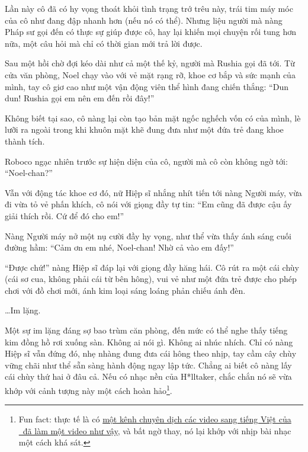 \documentclass[../main.tex]{subfiles}
\begin{document}
Lần này cô đã có hy vọng thoát khỏi tình trạng trớ trêu này, trái tim máy móc của cô như đang đập nhanh hơn (nếu nó có thể). Nhưng liệu người mà nàng Pháp sư gọi đến có thực sự giúp được cô, hay lại khiến mọi chuyện rối tung hơn nữa, một câu hỏi mà chỉ có thời gian mới trả lời được.

\ct

Sau một hồi chờ đợi kéo dài như cả một thế kỷ, người mà Rushia gọi đã tới. Từ cửa văn phòng, Noel chạy vào với vẻ mặt rạng rỡ, khoe cơ bắp và sức mạnh của mình, tay cô giơ cao như một vận động viên thể hình đang chiến thắng: ``Dun dun! Rushia gọi em nên em đến rồi đây!''

Không biết tại sao, cô nàng lại còn tạo bản mặt ngốc nghếch vốn có của mình, lè lưỡi ra ngoài trong khi khuôn mặt khẽ đung đưa như một đứa trẻ đang khoe thành tích.

Roboco ngạc nhiên trước sự hiện diện của cô, người mà cô còn không ngờ tới: ``Noel-chan?''

Vẫn với động tác khoe cơ đó, nữ Hiệp sĩ nhắng nhít tiến tới nàng Người máy, vừa đi vừa tỏ vẻ phấn khích, cô nói với giọng đầy tự tin: ``Em cũng đã được cậu ấy giải thích rồi. Cứ để đó cho em!''

\begin{figure}[H]
  \centering
  \begin{subfigure}[t]{0.45\textwidth}
    \centering
  \end{subfigure}
  \quad
  \begin{subfigure}[t]{0.45\textwidth}
    \centering
  \end{subfigure}
\end{figure}

Nàng Người máy nở một nụ cười đầy hy vọng, như thể vừa thấy ánh sáng cuối đường hầm: ``Cảm ơn em nhé, Noel-chan! Nhờ cả vào em đấy!''

``Được chứ!'' nàng Hiệp sĩ đáp lại với giọng đầy hăng hái. Cô rút ra một cái chùy (cái sơ cua, không phải cái từ bên hông), vui vẻ như một đứa trẻ được cho phép chơi với đồ chơi mới, ánh kim loại sáng loáng phản chiếu ánh đèn.

\dots Im lặng.

Một sự im lặng đáng sợ bao trùm căn phòng, đến mức có thể nghe thấy tiếng kim đồng hồ rơi xuống sàn. Không ai nói gì. Không ai nhúc nhích. Chỉ có nàng Hiệp sĩ vẫn đứng đó, nhẹ nhàng đung đưa cái hông theo nhịp, tay cầm cây chùy vững chãi như thể sẵn sàng hành động ngay lập tức. Chẳng ai biết cô nàng lấy cái chùy thứ hai ở đâu cả. Nếu có nhạc nền của H*lltaker, chắc chắn nó sẽ vừa khớp với cảnh tượng này một cách hoàn hảo\footnote{Fun fact: thực tế là có \href{https://www.youtube.com/watch?v=BWVsx8rlsnk}{một kênh chuyên dịch các video sang tiếng Việt của \hll\ đã làm một video như vậy}, và bất ngờ thay, nó lại khớp với nhịp bài nhạc một cách khá sát.}.
\end{document}
